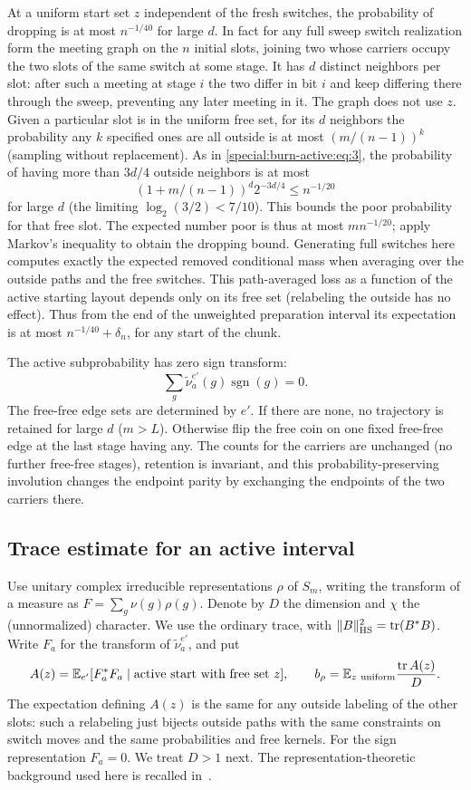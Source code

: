 At a uniform start set \(z\) independent of the fresh switches, the probability of dropping is at most \(n^{-1/40}\) for large \(d\). In fact for any full sweep switch realization form the meeting graph on the \(n\) initial slots, joining two whose carriers occupy the two slots of the same switch at some stage. It has \(d\) distinct neighbors per slot: after such a meeting at stage \(i\) the two differ in bit \(i\) and keep differing there through the sweep, preventing any later meeting in it. The graph does not use \(z\). Given a particular slot is in the uniform free set, for its \(d\) neighbors the probability any \(k\) specified ones are all outside is at most \((m/(n-1))^k\) (sampling without replacement). As in \eqref{special:burn-active:eq:3}, the probability of having more than \(3d/4\) outside neighbors is at most
\[
 (1+m/(n-1))^d 2^{-3d/4}\le n^{-1/20}
\]
for large \(d\) (the limiting \(\log_2(3/2)<7/10\)). This bounds the poor probability for that free slot. The expected number poor is thus at most \(m n^{-1/20}\); apply Markov's inequality to obtain the dropping bound. Generating full switches here computes exactly the expected removed conditional mass when averaging over the outside paths and the free switches. This path-averaged loss as a function of the active starting layout depends only on its free set (relabeling the outside has no effect). Thus from the end of the unweighted preparation interval its expectation is at most \(n^{-1/40}+\delta_n\), for any start of the chunk.

The active subprobability has zero sign transform:
\[
 \sum_g \widetilde\nu_a^{e'}(g)\operatorname{sgn}(g)=0.
\]
The free-free edge sets are determined by \(e'\). If there are none, no trajectory is retained for large \(d\) (\(m>L\)). Otherwise flip the free coin on one fixed free-free edge at the last stage having any. The counts for the carriers are unchanged (no further free-free stages), retention is invariant, and this probability-preserving involution changes the endpoint parity by exchanging the endpoints of the two carriers there.

\subsection{Trace estimate for an active interval}

Use unitary complex irreducible representations \(\rho\) of \(S_m\), writing the transform of a measure as \(F=\sum_g \nu(g)\rho(g)\). Denote by \(D\) the dimension and \(\chi\) the (unnormalized) character. We use the ordinary trace, with $\|B\|_{\mathrm{HS}}^2=\operatorname{tr}(B^*B)$. Write \(F_a\) for the transform of \(\widetilde\nu_a^{e'}\), and put
\[
 A(z)=\mathbb E_{e'}[F_a^*F_a\mid\text{active start with free set } z],
 \qquad b_\rho=\mathbb E_{z\ {\rm uniform}}\frac{\operatorname{tr} A(z)}{D}.
\]
The expectation defining \(A(z)\) is the same for any outside labeling of the other slots: such a relabeling just bijects outside paths with the same constraints on switch moves and the same probabilities and free kernels. For the sign representation \(F_a=0\). We treat \(D>1\) next.
The representation-theoretic background used here is recalled in~\cite{sagan,etingof}.

